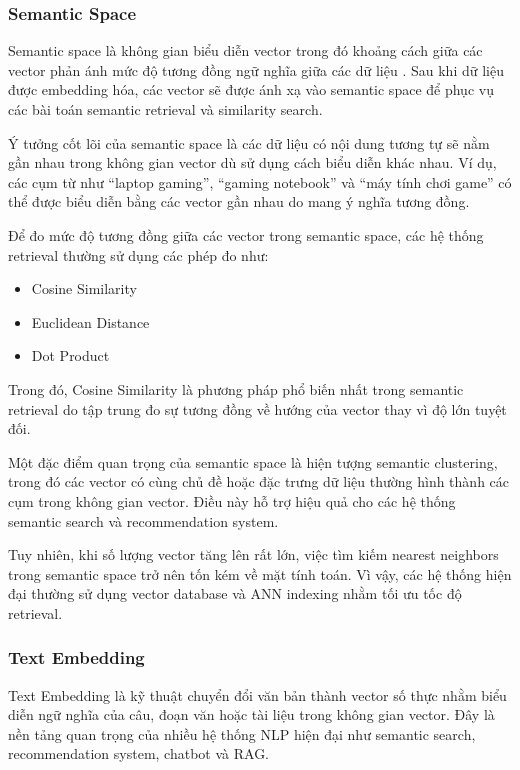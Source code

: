 \subsubsection{Semantic Space}

Semantic space là không gian biểu diễn vector trong đó khoảng cách giữa các vector phản ánh mức độ tương đồng ngữ nghĩa giữa các dữ liệu \cite{pinecone_embedding}. Sau khi dữ liệu được embedding hóa, các vector sẽ được ánh xạ vào semantic space để phục vụ các bài toán semantic retrieval và similarity search.

Ý tưởng cốt lõi của semantic space là các dữ liệu có nội dung tương tự sẽ nằm gần nhau trong không gian vector dù sử dụng cách biểu diễn khác nhau. Ví dụ, các cụm từ như ``laptop gaming'', ``gaming notebook'' và ``máy tính chơi game'' có thể được biểu diễn bằng các vector gần nhau do mang ý nghĩa tương đồng.

Để đo mức độ tương đồng giữa các vector trong semantic space, các hệ thống retrieval thường sử dụng các phép đo như:

\begin{itemize}
    \item Cosine Similarity
    \item Euclidean Distance
    \item Dot Product
\end{itemize}

Trong đó, Cosine Similarity là phương pháp phổ biến nhất trong semantic retrieval do tập trung đo sự tương đồng về hướng của vector thay vì độ lớn tuyệt đối.

Một đặc điểm quan trọng của semantic space là hiện tượng semantic clustering, trong đó các vector có cùng chủ đề hoặc đặc trưng dữ liệu thường hình thành các cụm trong không gian vector. Điều này hỗ trợ hiệu quả cho các hệ thống semantic search và recommendation system.

Tuy nhiên, khi số lượng vector tăng lên rất lớn, việc tìm kiếm nearest neighbors trong semantic space trở nên tốn kém về mặt tính toán. Vì vậy, các hệ thống hiện đại thường sử dụng vector database và ANN indexing nhằm tối ưu tốc độ retrieval.
\subsubsection{Text Embedding}

Text Embedding là kỹ thuật chuyển đổi văn bản thành vector số thực nhằm biểu diễn ngữ nghĩa của câu, đoạn văn hoặc tài liệu trong không gian vector. Đây là nền tảng quan trọng của nhiều hệ thống NLP hiện đại như semantic search, recommendation system, chatbot và RAG.

